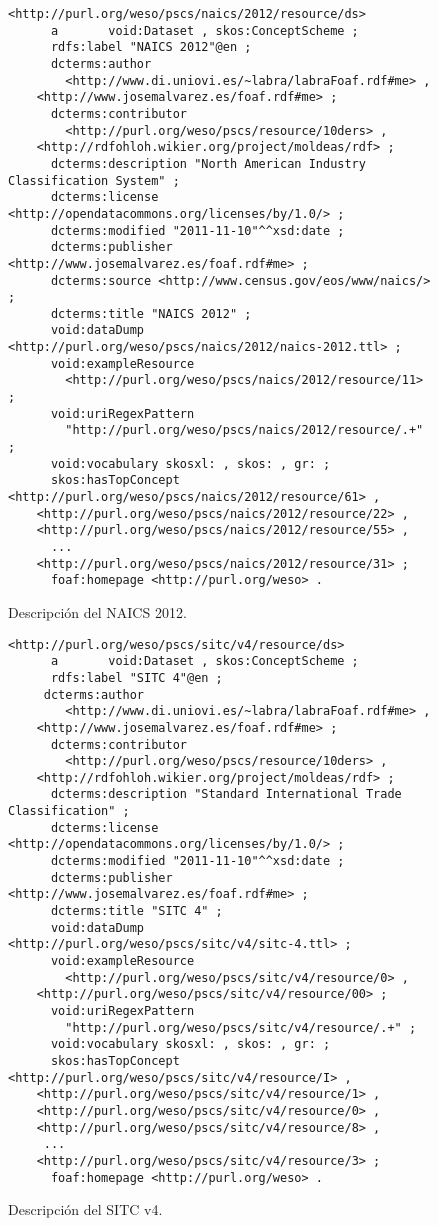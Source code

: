\begin{figure}[!htp]
\begin{lstlisting} 
<http://purl.org/weso/pscs/naics/2012/resource/ds>
      a       void:Dataset , skos:ConceptScheme ;
      rdfs:label "NAICS 2012"@en ;
      dcterms:author 
        <http://www.di.uniovi.es/~labra/labraFoaf.rdf#me> , 
	<http://www.josemalvarez.es/foaf.rdf#me> ;
      dcterms:contributor
        <http://purl.org/weso/pscs/resource/10ders> ,
	<http://rdfohloh.wikier.org/project/moldeas/rdf> ;    
      dcterms:description "North American Industry Classification System" ;
      dcterms:license <http://opendatacommons.org/licenses/by/1.0/> ;
      dcterms:modified "2011-11-10"^^xsd:date ;
      dcterms:publisher <http://www.josemalvarez.es/foaf.rdf#me> ;
      dcterms:source <http://www.census.gov/eos/www/naics/> ;
      dcterms:title "NAICS 2012" ;
      void:dataDump <http://purl.org/weso/pscs/naics/2012/naics-2012.ttl> ;
      void:exampleResource
        <http://purl.org/weso/pscs/naics/2012/resource/11> ;
      void:uriRegexPattern
        "http://purl.org/weso/pscs/naics/2012/resource/.+" ;
      void:vocabulary skosxl: , skos: , gr: ;
      skos:hasTopConcept <http://purl.org/weso/pscs/naics/2012/resource/61> , 
	<http://purl.org/weso/pscs/naics/2012/resource/22> , 
	<http://purl.org/weso/pscs/naics/2012/resource/55> , 
	  ... 
	<http://purl.org/weso/pscs/naics/2012/resource/31> ;
      foaf:homepage <http://purl.org/weso> .
\end{lstlisting}
	\caption{Descripción del \dataset NAICS 2012.}
	\label{fig:pscs-ds-cpa-2008}
\end{figure}



\begin{figure}[!htp]
\begin{lstlisting} 
<http://purl.org/weso/pscs/sitc/v4/resource/ds>
      a       void:Dataset , skos:ConceptScheme ;
      rdfs:label "SITC 4"@en ;
     dcterms:author 
        <http://www.di.uniovi.es/~labra/labraFoaf.rdf#me> , 
	<http://www.josemalvarez.es/foaf.rdf#me> ;
      dcterms:contributor
        <http://purl.org/weso/pscs/resource/10ders> ,
	<http://rdfohloh.wikier.org/project/moldeas/rdf> ; 
      dcterms:description "Standard International Trade Classification" ;
      dcterms:license <http://opendatacommons.org/licenses/by/1.0/> ;
      dcterms:modified "2011-11-10"^^xsd:date ;
      dcterms:publisher <http://www.josemalvarez.es/foaf.rdf#me> ;
      dcterms:title "SITC 4" ;
      void:dataDump <http://purl.org/weso/pscs/sitc/v4/sitc-4.ttl> ;
      void:exampleResource
        <http://purl.org/weso/pscs/sitc/v4/resource/0> , 
	<http://purl.org/weso/pscs/sitc/v4/resource/00> ;
      void:uriRegexPattern
        "http://purl.org/weso/pscs/sitc/v4/resource/.+" ;
      void:vocabulary skosxl: , skos: , gr: ;
      skos:hasTopConcept <http://purl.org/weso/pscs/sitc/v4/resource/I> , 
	<http://purl.org/weso/pscs/sitc/v4/resource/1> , 
	<http://purl.org/weso/pscs/sitc/v4/resource/0> , 
	<http://purl.org/weso/pscs/sitc/v4/resource/8> , 
	 ...
	<http://purl.org/weso/pscs/sitc/v4/resource/3> ;
      foaf:homepage <http://purl.org/weso> .
\end{lstlisting}
	\caption{Descripción del \dataset SITC v4.}
	\label{fig:pscs-ds-cpa-2008}
\end{figure}

